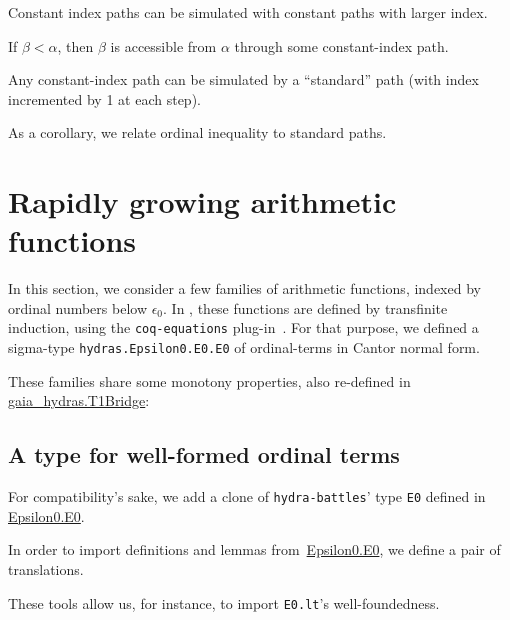 Constant index paths can be simulated with constant paths with larger index.
 


If $\beta<\alpha$, then $\beta$ is accessible from $\alpha$
through some constant-index path.


Any constant-index path can be simulated by a ``standard'' path (with index incremented by 1 at each step).


As a corollary, we relate ordinal inequality to standard paths.





\section{Rapidly growing arithmetic functions}
In this section, we consider a few families of arithmetic functions, indexed by ordinal numbers below $\epsilon_0$. In \HydrasLib, these functions are defined by transfinite induction, using the \texttt{coq-equations} plug-in~\cite{sozeau:hal-01671777}. For that purpose, we defined a sigma-type
\texttt{hydras.Epsilon0.E0.E0} of ordinal-terms in Cantor normal form. 

These families share some monotony properties, also re-defined in
\href{../theories/html/gaia_hydras.T1Bridge.html}{gaia\_hydras.T1Bridge}:

\subsection{A type for well-formed ordinal terms}
\label{sect:E0-gaia-hydras}
For compatibility's sake, we add a clone of \texttt{hydra-battles}' type \texttt{E0} defined in \href{../theories/html/hydras.Epsilon0.E0.html}{Epsilon0.E0}.


In order to import definitions and lemmas
from~\href{../theories/html/hydras.Epsilon0.E0.html}{Epsilon0.E0}, we define a pair of translations.


These tools allow us, for instance,  to import \texttt{E0.lt}'s  well-foundedness.

